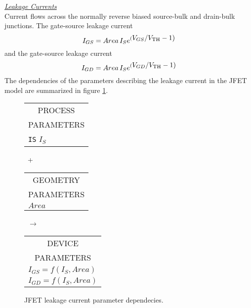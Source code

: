 \noindent\underline{\sl \large Leakage Currents}\\[0.1in]
Current flows across the normally reverse biased source-bulk and drain-bulk
junctions.
The gate-source leakage current
\begin{equation}
I_{GS} = Area\,I_{S}e^{(\textstyle V_{GS}/V_{\mbox{\scriptsize TH}} -1)}
\end{equation}
and the gate-source leakage current
\begin{equation}
I_{GD} = Area\,I_{S}e^{(\textstyle V_{GD}/V_{\mbox{\scriptsize TH}} -1)}
\end{equation}
The dependencies of the parameters describing the leakage current
in the JFET model are summarized in
figure \ref{jleakage}.\\[0.2in]
\begin{figure}[hbp]
\begin{tabular}[t]{|p{1in}|}
\hline
\multicolumn{1}{|c|}{PROCESS} \\
\multicolumn{1}{|c|}{PARAMETERS} \\
\hline
{\tt IS} \hfill $I_S$\\
\hline
\end{tabular}
\hfill
\parbox{0.1in}{\ \vspace*{0.2in}\newline +}
\hfill
\begin{tabular}[t]{|p{1in}|}
\hline
\multicolumn{1}{|c|}{GEOMETRY} \\
\multicolumn{1}{|c|}{PARAMETERS} \\
\hline
$Area$\\
\hline
\end{tabular}
\hfill
\parbox{0.1in}{\ \vspace*{0.2in}\newline $\rightarrow$}
\hfill
\begin{tabular}[t]{|p{1.8in}|}
\hline
\multicolumn{1}{|c|}{DEVICE} \\
\multicolumn{1}{|c|}{PARAMETERS} \\
\hline
\hspace*{\fill}$I_{GS} = f(I_S, Area)$\\
\hspace*{\fill}$I_{GD} = f(I_S, Area)$\\
\hline
\end{tabular}
\caption{JFET leakage current parameter dependecies. \label{jleakage}}
\end{figure}

